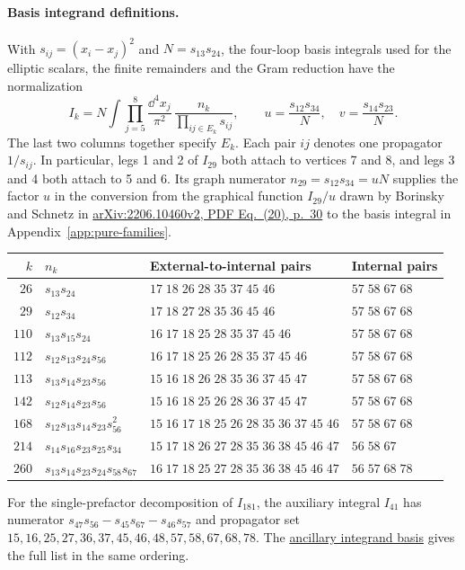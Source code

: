 \clearpage
\paragraph{Basis integrand definitions.}
With \(s_{ij}=(x_i-x_j)^2\) and \(N=s_{13}s_{24}\), the four-loop
basis integrals used for the elliptic scalars, the finite remainders and
the Gram reduction have the normalization
\[
 I_k=N\int\prod_{j=5}^{8}\frac{\dd^4x_j}{\pi^2}\,
       \frac{n_k}{\prod_{ij\in E_k}s_{ij}},\qquad
 u=\frac{s_{12}s_{34}}{N},\quad v=\frac{s_{14}s_{23}}{N}.
\]
The last two columns together specify \(E_k\). Each pair \(ij\) denotes
one propagator \(1/s_{ij}\). In particular, legs 1 and 2 of \(I_{29}\)
both attach to vertices 7 and 8, and legs 3 and 4 both attach to 5 and 6.
Its graph numerator \(n_{29}=s_{12}s_{34}=uN\) supplies the factor \(u\)
in the conversion from the graphical function \(I_{29}/u\) drawn by Borinsky and Schnetz
in \href{https://arxiv.org/pdf/2206.10460v2\#page=30}{arXiv:2206.10460v2,
PDF Eq.~(20), p.~30} to the basis integral in Appendix~\ref{app:pure-families}.

\begin{center}\small\setlength{\tabcolsep}{3pt}
\begin{tabular}{@{}r l l l@{}}\toprule
\(k\) & \(n_k\) & External-to-internal pairs & Internal pairs\\\midrule
$26$ & $s_{13}s_{24}$ & $17\;18\;26\;28\;35\;37\;45\;46$ & $57\;58\;67\;68$ \\
$29$ & $s_{12}s_{34}$ & $17\;18\;27\;28\;35\;36\;45\;46$ & $57\;58\;67\;68$ \\
$110$ & $s_{13}s_{15}s_{24}$ & $16\;17\;18\;25\;28\;35\;37\;45\;46$ & $57\;58\;67\;68$ \\
$112$ & $s_{12}s_{13}s_{24}s_{56}$ & $16\;17\;18\;25\;26\;28\;35\;37\;45\;46$ & $57\;58\;67\;68$ \\
$113$ & $s_{13}s_{14}s_{23}s_{56}$ & $15\;16\;18\;26\;28\;35\;36\;37\;45\;47$ & $57\;58\;67\;68$ \\
$142$ & $s_{12}s_{14}s_{23}s_{56}$ & $15\;16\;18\;25\;26\;28\;36\;37\;45\;47$ & $57\;58\;67\;68$ \\
$168$ & $s_{12}s_{13}s_{14}s_{23}s_{56}^2$ & $15\;16\;17\;18\;25\;26\;28\;35\;36\;37\;45\;46$ & $57\;58\;67\;68$ \\
$214$ & $s_{14}s_{16}s_{23}s_{25}s_{34}$ & $15\;17\;18\;26\;27\;28\;35\;36\;38\;45\;46\;47$ & $56\;58\;67$ \\
$260$ & $s_{13}s_{14}s_{23}s_{24}s_{58}s_{67}$ & $16\;17\;18\;25\;27\;28\;35\;36\;38\;45\;46\;47$ & $56\;57\;68\;78$ \\
\bottomrule\end{tabular}
\end{center}
For the single-prefactor decomposition of \(I_{181}\), the auxiliary
integral \(I_{41}\) has numerator \(s_{47}s_{56}-s_{45}s_{67}-s_{46}s_{57}\)
and propagator set
\(15,16,25,27,36,37,45,46,48,57,58,67,68,78\).
The \href{https://github.com/windfolgen/svbwalkthrough/blob/main/anc/4Loop_int_basis.m}{ancillary integrand basis}
gives the full list in the same ordering.
